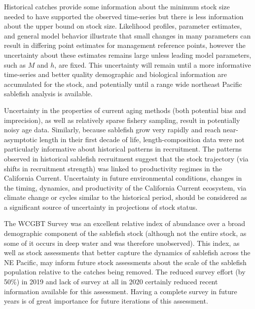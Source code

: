 \documentclass[11pt,
  english,
  a4paper,
]{article}
\begin{document}
\leavevmode\tagmcend\tagstructend\par


Historical catches provide some information about the minimum stock size needed to have supported the observed time-series but there is less information about the upper bound on stock size. Likelihood profiles, parameter estimates, and general model behavior illustrate that small changes in many parameters can result in differing point estimates for management reference points, however the uncertainty about these estimates remains large unless leading model parameters, such as {\(M\)\leavevmode\tagmcend\tagstructend} and {\(h\)\leavevmode\tagmcend\tagstructend}, are fixed. This uncertainty will remain until a more informative time-series and better quality demographic and biological information are accumulated for the stock, and potentially until a range wide northeast Pacific sablefish analysis is available.

\leavevmode\tagmcend\tagstructend\par


Uncertainty in the properties of current aging methods (both potential bias and imprecision), as well as relatively sparse fishery sampling, result in potentially noisy age data. Similarly, because sablefish grow very rapidly and reach near-asymptotic length in their first decade of life, length-composition data were not particularly informative about historical patterns in recruitment. The patterns observed in historical sablefish recruitment suggest that the stock trajectory (via shifts in recruitment strength) was linked to productivity regimes in the California Current. Uncertainty in future environmental conditions, changes in the timing, dynamics, and productivity of the California Current ecosystem, via climate change or cycles similar to the historical period, should be considered as a significant source of uncertainty in projections of stock status.

\leavevmode\tagmcend\tagstructend\par


The WCGBT Survey was an excellent relative index of abundance over a broad demographic component of the sablefish stock (although not the entire stock, as some of it occurs in deep water and was therefore unobserved). This index, as well as stock assessments that better capture the dynamics of sablefish across the NE Pacific, may inform future stock assessments about the scale of the sablefish population relative to the catches being removed. The reduced survey effort (by 50\%) in 2019 and lack of survey at all in 2020 certainly reduced recent information available for this assessment. Having a complete survey in future years is of great importance for future iterations of this assessment.
\end{document}
